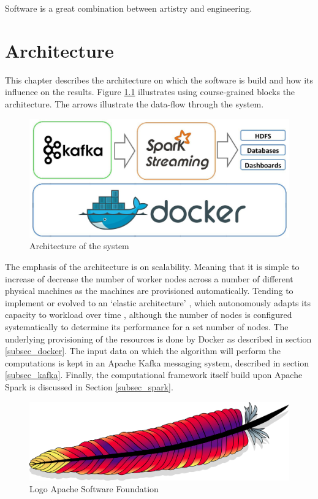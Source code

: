 \begin{savequote}[90mm] 
Software is a great combination between artistry and engineering.  
\end{savequote}

\chapter{Architecture \label{chap:architecture}}

This chapter describes the architecture on which the software is build and how its influence on the results. Figure \ref{fig:architecture} illustrates using course-grained blocks the architecture. The arrows illustrate the data-flow through the system. 

\begin{figure}[ht!]
\centering
\includegraphics[width=\textwidth]{figures/architecture.jpg}
\caption{Architecture of the system}
\label{fig:architecture}
\end{figure}

The emphasis of the architecture is on scalability. Meaning that it is simple to increase of decrease the number of worker nodes across a number of different physical machines as the machines are provisioned automatically. Tending to implement or evolved to an `elastic architecture' \cite{9780470887998}, which autonomously adapts its capacity to workload over time \cite{180145}, although the number of nodes is configured systematically to determine its performance for a set number of nodes. The underlying provisioning of the resources is done by Docker as described in section \ref{subsec_docker}. The input data on which the algorithm will perform the computations is kept in an Apache Kafka messaging system, described in section \ref{subsec_kafka}. Finally, the computational framework itself build upon Apache Spark is discussed in Section \ref{subsec_spark}.

\begin{figure}[ht!]
\centering
\includegraphics[width=.6\textwidth]{figures/asf.png}
\caption{Logo Apache Software Foundation}
\label{fig:asf}
\end{figure}

